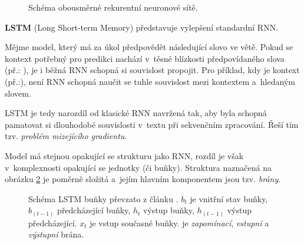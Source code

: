 \begin{figure}[hbt]
    \centering
	\caption{Schéma obousměrné rekurentní neuronové sítě.}
	\label{bidirRNN}
\end{figure}

\pagebreak\textbf{LSTM} (Long Short-term Memory) představuje vylepšení standardní RNN.\par \smallskip
Mějme model, který má za úkol předpovědět následující slovo ve větě. Pokud se kontext potřebný pro predikci nachází v~těsné blízkosti předpovídaného slova (př.: ), je i běžná RNN schopná si souvislost propojit. Pro příklad, kdy je kontext  (př.:), není RNN schopná naučit se tuhle souvislost mezi kontextem a~hledaným slovem.\par \smallskip
LSTM je tedy narozdíl od klasické RNN navržená tak, aby byla schopná pamatovat si dlouhodobé souvislosti v~textu při sekvenčním zpracování. Řeší tím tzv. \emph{problém mizejícího gradientu}.\par
Model má stejnou opakující se strukturu jako RNN, rozdíl je však v~komplexnosti opakující se jednotky (či buňky). Struktura naznačená na obrázku \ref{lstm_cell} je poměrně složitá a~jejím hlavním komponentem jsou tzv. \emph{brány}. 

\begin{figure}[hbt]
    \centering
	\caption{Schéma LSTM buňky převzato z článku \cite{understandingLSTM}. $b_t$ je vnitřní stav buňky, $b_{(t-1)}$ předcházející buňky, $h_t$ výstup buňky, $h_{(t-1)}$ výstup předcházející. $x_t$ je vstup současné buňky.  je \emph{zapomínací},  \emph{vstupní} a  \emph{výstupní} brána.}
	\label{lstm_cell}
\end{figure}

